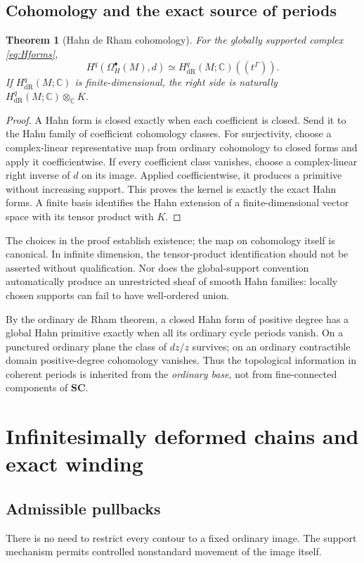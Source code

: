 \documentclass[11pt,letterpaper]{article}
\newtheorem{theorem}{Theorem}[section]
\theoremstyle{definition}
\theoremstyle{remark}
\newcommand{\SC}{\mathbf{SC}}
\newcommand{\C}{\mathbb C}
\newcommand{\dR}{\mathrm{dR}}
\numberwithin{equation}{section}
\begin{document}
\subsection{Cohomology and the exact source of periods}
\begin{theorem}[Hahn de Rham cohomology]\label{thm:deRham}
For the globally supported complex \eqref{eq:Hforms},
\begin{equation}\label{eq:deRham}
H^q(\Omega_H^\bullet(M),d)
\simeq H^q_{\dR}(M;\C)((t^\Gamma)).
\end{equation}
If $H^q_{\dR}(M;\C)$ is finite-dimensional, the right side is naturally
$H^q_{\dR}(M;\C)\otimes_\C K$.
\end{theorem}
\begin{proof}
A Hahn form is closed exactly when each coefficient is closed. Send it to the Hahn family of coefficient cohomology classes. For surjectivity, choose a complex-linear representative map from ordinary cohomology to closed forms and apply it coefficientwise. If every coefficient class vanishes, choose a complex-linear right inverse of $d$ on its image. Applied coefficientwise, it produces a primitive without increasing support. This proves the kernel is exactly the exact Hahn forms. A finite basis identifies the Hahn extension of a finite-dimensional vector space with its tensor product with $K$.
\end{proof}
The choices in the proof establish existence; the map on cohomology itself is canonical. In infinite dimension, the tensor-product identification should not be asserted without qualification. Nor does the global-support convention automatically produce an unrestricted sheaf of smooth Hahn families: locally chosen supports can fail to have well-ordered union.

By the ordinary de Rham theorem, a closed Hahn form of positive degree has a global Hahn primitive exactly when all its ordinary cycle periods vanish. On a punctured ordinary plane the class of $dz/z$ survives; on an ordinary contractible domain positive-degree cohomology vanishes. Thus the topological information in coherent periods is inherited from the \emph{ordinary base}, not from fine-connected components of $\SC$.

\section{Infinitesimally deformed chains and exact winding}\label{sec:deformations}
\subsection{Admissible pullbacks}
There is no need to restrict every contour to a fixed ordinary image. The support mechanism permits controlled nonstandard movement of the image itself.
\end{document}
